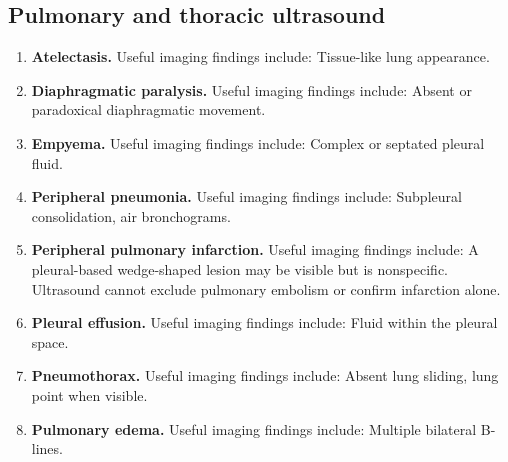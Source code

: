 \subsection{Pulmonary and thoracic ultrasound}
\begin{enumerate}[leftmargin=*,itemsep=0.45em,topsep=0.4em]
\item \textbf{Atelectasis.} Useful imaging findings include: Tissue-like lung appearance.
\item \textbf{Diaphragmatic paralysis.} Useful imaging findings include: Absent or paradoxical diaphragmatic movement.
\item \textbf{Empyema.} Useful imaging findings include: Complex or septated pleural fluid.
\item \textbf{Peripheral pneumonia.} Useful imaging findings include: Subpleural consolidation, air bronchograms.
\item \textbf{Peripheral pulmonary infarction.} Useful imaging findings include: A pleural-based wedge-shaped lesion may be visible but is nonspecific. Ultrasound cannot exclude pulmonary embolism or confirm infarction alone.
\item \textbf{Pleural effusion.} Useful imaging findings include: Fluid within the pleural space.
\item \textbf{Pneumothorax.} Useful imaging findings include: Absent lung sliding, lung point when visible.
\item \textbf{Pulmonary edema.} Useful imaging findings include: Multiple bilateral B-lines.
\end{enumerate}

